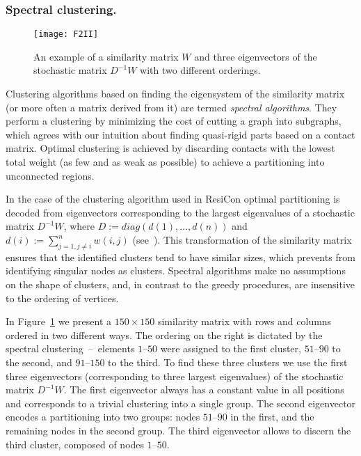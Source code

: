 \documentclass[a4paper,11pt,twoside]{book}%
\begin{document}
\subsubsection*{Spectral clustering.}
\begin{figure}
\centering
\texttt{[image: F2II]}
\caption{
An example of a similarity matrix $W$ and three eigenvectors of the stochastic matrix $D^{-1}W$ with two different orderings.
}
\label{clustering}
\end{figure}

Clustering algorithms based on finding the eigensystem of the similarity matrix (or more often a matrix derived from it) are termed \emph{spectral algorithms}.
They perform a clustering by minimizing the cost of cutting a graph into subgraphs, which agrees with our intuition about finding quasi-rigid parts based on a contact matrix.
Optimal clustering is achieved by discarding contacts with the lowest total weight (as few and as weak as possible) to achieve a partitioning into unconnected regions.

In the case of the clustering algorithm used in ResiCon optimal partitioning is decoded from eigenvectors corresponding to the largest eigenvalues of a stochastic matrix $D^{-1}W$, where $D:=diag(d(1),\ldots,d(n))$ and $d(i):=\sum_{j=1,j\neq i}^{n} w(i,j)$ (see~\cite{weber2004perron}).
This transformation of the similarity matrix ensures that the identified clusters tend to have similar sizes, which prevents from identifying singular nodes as clusters.
Spectral algorithms make no assumptions on the shape of clusters, and, in contrast to the greedy procedures, are insensitive to the ordering of vertices.

In Figure~\ref{clustering} we present a $150\times 150$ similarity matrix with rows and columns ordered in two different ways.
The ordering on the right is dictated by the spectral clustering~--~elements $1\text{--}50$ were assigned to the first cluster, $51\text{--}90$ to the second, and $91\text{--}150$ to the third.
To find these three clusters we use the first three eigenvectors (corresponding to three largest eigenvalues) of the stochastic matrix $D^{-1}W$.
The first eigenvector always has a constant value in all positions and corresponds to a trivial clustering into a single group.
The second eigenvector encodes a partitioning into two groups: nodes $51\text{--}90$ in the first, and the remaining nodes in the second group.
The third eigenvector allows to discern the third cluster, composed of nodes $1\text{--}50$.
\end{document}
